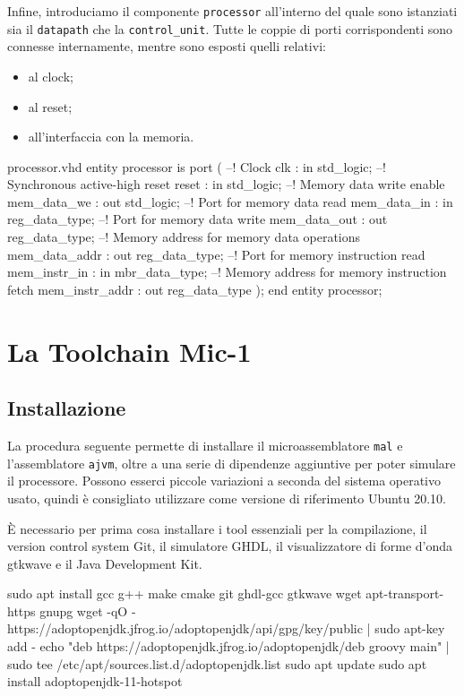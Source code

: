 \documentclass[a4paper,12pt]{scrreprt}
\begin{document}
Infine, introduciamo il componente \lstinline{processor} all'interno del quale
sono istanziati sia il \lstinline{datapath} che la \lstinline{control_unit}.
Tutte le coppie di porti corrispondenti sono connesse internamente, mentre sono
esposti quelli relativi:
\begin{itemize}
  \item al clock;
  \item al reset;
  \item all'interfaccia con la memoria.
\end{itemize}

\begin{myvhdl}{processor.vhd}
entity processor is
  port (
    --! Clock
    clk            : in  std_logic;
    --! Synchronous active-high reset
    reset          : in  std_logic;
    --! Memory data write enable
    mem_data_we    : out std_logic;
    --! Port for memory data read
    mem_data_in    : in  reg_data_type;
    --! Port for memory data write
    mem_data_out   : out reg_data_type;
    --! Memory address for memory data operations
    mem_data_addr  : out reg_data_type;
    --! Port for memory instruction read
    mem_instr_in   : in  mbr_data_type;
    --! Memory address for memory instruction fetch
    mem_instr_addr : out reg_data_type
    );
end entity processor;
\end{myvhdl}

\chapter{La Toolchain Mic-1}

\section{Installazione}

La procedura seguente permette di installare il microassemblatore
\lstinline{mal} e l'assemblatore \lstinline{ajvm}, oltre a una serie
di dipendenze aggiuntive per poter simulare il processore. Possono
esserci piccole variazioni a seconda del sistema operativo usato,
quindi è consigliato utilizzare come versione di riferimento Ubuntu
20.10.

È necessario per prima cosa installare i tool essenziali per la
compilazione, il version control system Git, il simulatore GHDL, il
visualizzatore di forme d'onda gtkwave e il Java Development Kit.

\begin{commandshell}
  sudo apt install gcc g++ make cmake git ghdl-gcc gtkwave wget apt-transport-https gnupg
  wget -qO - https://adoptopenjdk.jfrog.io/adoptopenjdk/api/gpg/key/public | sudo apt-key add -
  echo "deb https://adoptopenjdk.jfrog.io/adoptopenjdk/deb groovy main" | sudo tee /etc/apt/sources.list.d/adoptopenjdk.list
  sudo apt update
  sudo apt install adoptopenjdk-11-hotspot
\end{commandshell}
\end{document}
